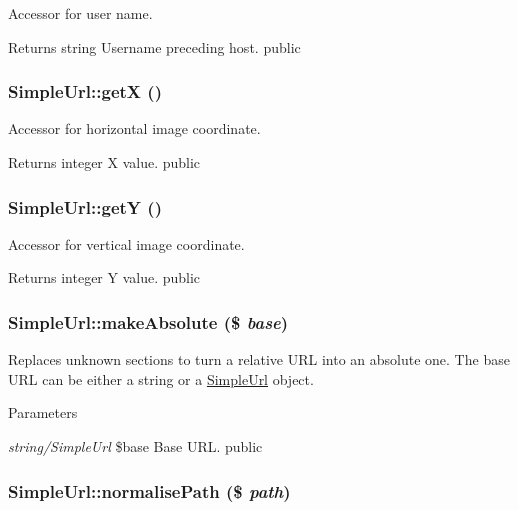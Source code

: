 \label{class_simple_url_a23df1af0d73592a0077891311c557e32}
Accessor for user name. \begin{DoxyReturn}{Returns}
string Username preceding host.  public 
\end{DoxyReturn}
\hypertarget{class_simple_url_a3833f1dbcb91195f215a77b3e58fc95e}{
\subsubsection[{getX}]{\setlength{\rightskip}{0pt plus 5cm}SimpleUrl::getX ()}}
\label{class_simple_url_a3833f1dbcb91195f215a77b3e58fc95e}
Accessor for horizontal image coordinate. \begin{DoxyReturn}{Returns}
integer X value.  public 
\end{DoxyReturn}
\hypertarget{class_simple_url_aab225e4a1778f8b8211835c83761b331}{
\subsubsection[{getY}]{\setlength{\rightskip}{0pt plus 5cm}SimpleUrl::getY ()}}
\label{class_simple_url_aab225e4a1778f8b8211835c83761b331}
Accessor for vertical image coordinate. \begin{DoxyReturn}{Returns}
integer Y value.  public 
\end{DoxyReturn}
\hypertarget{class_simple_url_a06bbcf19f78e78bc6f1ea8604a9541ce}{
\subsubsection[{makeAbsolute}]{\setlength{\rightskip}{0pt plus 5cm}SimpleUrl::makeAbsolute (\$ {\em base})}}
\label{class_simple_url_a06bbcf19f78e78bc6f1ea8604a9541ce}
Replaces unknown sections to turn a relative URL into an absolute one. The base URL can be either a string or a \hyperlink{class_simple_url}{SimpleUrl} object. 
\begin{DoxyParams}{Parameters}
\item[{\em string/SimpleUrl}]\$base Base URL.  public \end{DoxyParams}
\hypertarget{class_simple_url_a50e343f5c31919b3d1051760f32ec3ae}{
\subsubsection[{normalisePath}]{\setlength{\rightskip}{0pt plus 5cm}SimpleUrl::normalisePath (\$ {\em path})}}
